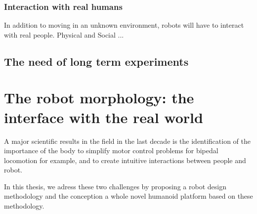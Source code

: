 \subsubsection{Interaction with real humans} %
In addition to moving in an unknown environment, robots will have to interact with real people.
Physical and Social ...


\subsection{The need of long term experiments} %


\section{The robot morphology: the interface with the real world} %

A major scientific results in the field in the last decade is the identification of the importance of the body to simplify motor control problems for bipedal locomotion for example, and to create intuitive interactions between people and robot.




In this thesis, we adress these two challenges by proposing a robot design methodology and the conception a whole novel humanoid platform based on these methodology.
